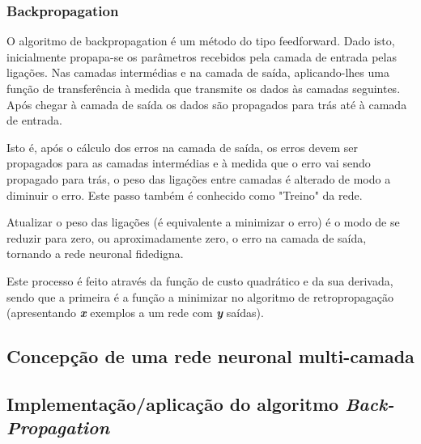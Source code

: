 \documentclass[10pt,a4paper]{article}
\begin{document}
\subsubsection{Backpropagation}

O algoritmo de backpropagation é um método do tipo feedforward.
Dado isto, inicialmente propapa-se os parâmetros recebidos pela camada de entrada pelas ligações. Nas camadas intermédias e na camada de saída, aplicando-lhes uma função de transferência à medida que transmite os dados às camadas seguintes. Após chegar à camada de saída os dados são propagados para trás até à camada de entrada.

Isto é, após o cálculo dos erros na camada de saída, os erros devem ser propagados para as camadas intermédias e à medida que o erro vai sendo propagado para trás, o peso das ligações entre camadas é alterado de modo a diminuir o erro. Este passo também é conhecido como "Treino" da rede.

Atualizar o peso das ligações (é equivalente a minimizar o erro) é o modo de se reduzir para zero, ou aproximadamente zero, o erro na camada de saída, tornando a rede neuronal fidedigna.

Este processo é feito através da função de custo quadrático e da sua derivada, sendo que a primeira é a função a minimizar no algoritmo de retropropagação (apresentando \textbf{\textit{x}} exemplos a um rede com \textbf{\textit{y}} saídas).































\subsection{Concepção de uma rede neuronal multi-camada}
\subitem



\subsection{Implementação/aplicação do algoritmo \textit{Back-Propagation}}
\subitem
\end{document}
